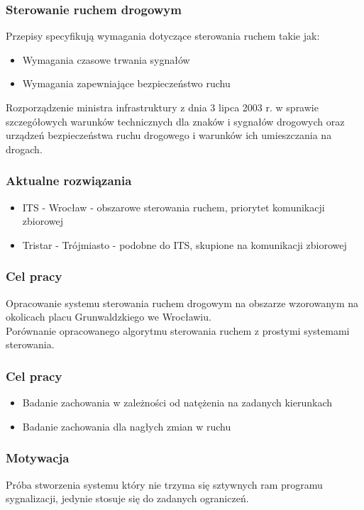 \documentclass[17pt]{beamer}
\begin{document}
\begin{frame}
 \frametitle{\vspace{22px}Sterowanie ruchem drogowym}
 Przepisy specyfikują wymagania dotyczące sterowania ruchem takie jak:
 \begin{itemize}
  \item{Wymagania czasowe trwania sygnałów}
  \item{Wymagania zapewniające bezpieczeństwo ruchu}
 \end{itemize}
 {\tiny Rozporządzenie ministra infrastruktury z dnia 3 lipca 2003 r. w sprawie szczegółowych warunków technicznych
 dla znaków i sygnałów drogowych oraz urządzeń bezpieczeństwa ruchu drogowego i warunków ich umieszczania na drogach.}
\end{frame}

\begin{frame}[shrink=5]
 \frametitle{\vspace{22px}Aktualne rozwiązania}
 \begin{itemize}
  \item{ITS - Wrocław - obszarowe sterowania ruchem, priorytet komunikacji zbiorowej}
  \item{Tristar - Trójmiasto - podobne do ITS, skupione na komunikacji zbiorowej}
 \end{itemize}
\end{frame}

\begin{frame}[shrink=5]
 \frametitle{\vspace{22px}Cel pracy}
 Opracowanie systemu sterowania ruchem drogowym na obszarze wzorowanym na okolicach placu Grunwaldzkiego we Wrocławiu.\\
 Porównanie opracowanego algorytmu sterowania ruchem z prostymi systemami sterowania.
\end{frame}

\begin{frame}[shrink=5]
 \frametitle{\vspace{22px}Cel pracy}
 \begin{itemize}
  \item{Badanie zachowania w zależności od natężenia na zadanych kierunkach}
  \item{Badanie zachowania dla nagłych zmian w ruchu}
 \end{itemize}
\end{frame}

\begin{frame}[shrink=5]
 \frametitle{\vspace{22px}Motywacja}
 Próba stworzenia systemu który nie trzyma się sztywnych ram programu sygnalizacji, jedynie stosuje się do zadanych ograniczeń.
\end{frame}
\end{document}
